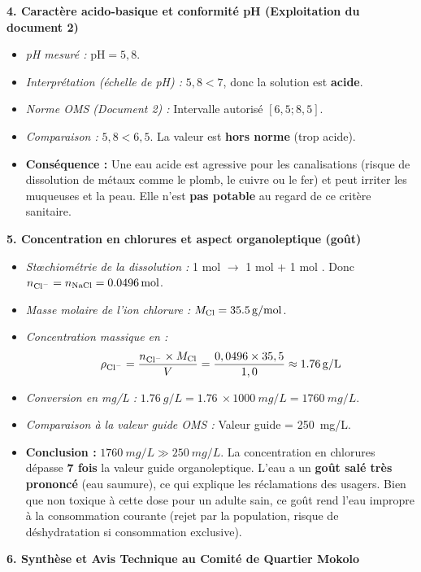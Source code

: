 \documentclass[11pt]{article}
\begin{document}
\begin{exoresolu}
\medskip
\textbf{4. Caractère acido-basique et conformité pH (Exploitation du document 2)}
\begin{itemize}
    \item \textit{pH mesuré :} $\text{pH} = 5,8$.
    \item \textit{Interprétation (échelle de pH) :} $5,8 < 7$, donc la solution est \textbf{acide}.
    \item \textit{Norme OMS (Document 2) :} Intervalle autorisé $[6,5 ; 8,5]$.
    \item \textit{Comparaison :} $5,8 < 6,5$. La valeur est \textbf{hors norme} (trop acide).
    \item \textbf{Conséquence :} Une eau acide est agressive pour les canalisations (risque de dissolution de métaux comme le plomb, le cuivre ou le fer) et peut irriter les muqueuses et la peau. Elle n'est \textbf{pas potable} au regard de ce critère sanitaire.
\end{itemize}

\medskip
\textbf{5. Concentration en chlorures  et aspect organoleptique (goût)}
\begin{itemize}
    \item \textit{Stœchiométrie de la dissolution :} 1 mol  $\rightarrow$ 1 mol  + 1 mol . Donc $n_{\ce{Cl-}} = n_{\ce{NaCl}} = \SI{0,0496}{mol}$.
    \item \textit{Masse molaire de l'ion chlorure :} $M_{\ce{Cl}} = \SI{35,5}{g/mol}$.
    \item \textit{Concentration massique en  :}
    \[ \rho_{\ce{Cl-}} = \frac{n_{\ce{Cl-}} \times M_{\ce{Cl}}}{V} = \frac{0,0496 \times 35,5}{1,0} \approx \SI{1,76}{g/L} \]
    \item \textit{Conversion en mg/L :} $\SI{1,76}{g/L} = \SI{1,76}{\times} \SI{1000}{mg/L} = \SI{1760}{mg/L}$.
    \item \textit{Comparaison à la valeur guide OMS :} Valeur guide = \SI{250}{mg/L}.
    \item \textbf{Conclusion :} $\SI{1760}{mg/L} \gg \SI{250}{mg/L}$. La concentration en chlorures dépasse \textbf{7 fois} la valeur guide organoleptique. L'eau a un \textbf{goût salé très prononcé} (eau saumure), ce qui explique les réclamations des usagers. Bien que non toxique à cette dose pour un adulte sain, ce goût rend l'eau impropre à la consommation courante (rejet par la population, risque de déshydratation si consommation exclusive).
\end{itemize}

\medskip
\textbf{6. Synthèse et Avis Technique au Comité de Quartier Mokolo}


\end{exoresolu}
\end{document}
